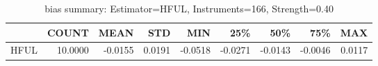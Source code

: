 \begin{table}[ht]
\centering
\caption{bias summary: Estimator=HFUL, Instruments=166, Strength=0.40}
\begin{tabular}{lrrrrrrrr}
\toprule
 & COUNT & MEAN & STD & MIN & 25\% & 50\% & 75\% & MAX \\
\midrule
HFUL & 10.0000 & -0.0155 & 0.0191 & -0.0518 & -0.0271 & -0.0143 & -0.0046 & 0.0117 \\
\bottomrule
\end{tabular}
\end{table}
